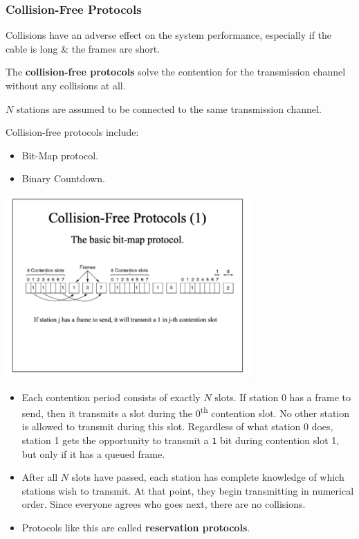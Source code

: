 \documentclass[11pt]{article}
\begin{document}
\subsubsection{Collision-Free Protocols}
Collisions have an adverse effect on the system performance, especially if the cable is long \& the 
frames are short. 

The \textbf{collision-free protocols} solve the contention for the transmission channel without any 
collisions at all. 

$N$ stations are assumed to be connected to the same transmission channel.

Collision-free protocols include:
\begin{itemize}
    \item   Bit-Map protocol. 
    \item   Binary Countdown.
\end{itemize}

\begin{center}
    \includegraphics[width=0.7\textwidth]{bitmap.png}
\end{center}
\begin{itemize}
    \item   Each contention period consists of exactly $N$ slots. 
            If station 0 has a frame to send, then it transmits a slot during the 0\textsuperscript{th} 
            contention slot. 
            No other station is allowed to transmit during this slot. 
            Regardless of what station 0 does, station 1 gets the opportunity to transmit a \verb|1| bit during 
            contention slot 1, but only if it has a queued frame.
    \item   After all $N$ slots have passed, each station has complete knowledge of which stations wish to transmit. 
            At that point, they begin transmitting in numerical order. 
            Since everyone agrees who goes next, there are no collisions.
    \item   Protocols like this are called \textbf{reservation protocols}.
\end{itemize}
\end{document}
